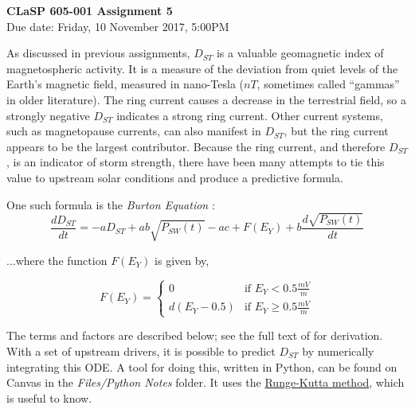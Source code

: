 \documentclass[12pt, letterpaper]{article}
\begin{document}
\begin{center}
  {\LARGE \textbf{CLaSP 605-001 Assignment 5}}\\
  {\large Due date: Friday, 10 November 2017, 5:00PM}\\
\end{center}

As discussed in previous assignments, $D_{ST}$ is a valuable geomagnetic index
of magnetospheric activity.  It is a measure of the deviation from quiet levels
of the Earth's magnetic field, measured in nano-Tesla ($nT$, sometimes called
``gammas'' in older literature).  The ring current causes a decrease in the
terrestrial field, so a strongly negative $D_{ST}$ indicates a strong ring
current.  Other current systems, such as magnetopause currents, can also
manifest in $D_{ST}$, but the ring current appears to be the largest
contributor.  Because the ring current, and therefore $D_{ST}$, is an indicator
of storm strength, there have been many attempts to tie this value to 
upstream solar conditions and produce a predictive formula.

One such formula is the \textit{Burton Equation} \citep{Burton:1975}:
\begin{equation}
  \frac{d D_{ST}}{dt}=-aD_{ST}+ab\sqrt{P_{SW}(t)}-ac+F(E_{Y})+
  b\frac{d\sqrt{P_{SW}(t)}}{dt}
\end{equation}

\noindent ...where the function $F(E_{Y})$ is given by,

\begin{equation}
  \label{eq:F}
  F(E_{Y}) = 
  \begin{cases}
    0 & \text{if $E_Y<0.5\frac{mV}{m}$}\\
    d(E_Y-0.5) & \text{if $E_Y\geq 0.5\frac{mV}{m}$}
  \end{cases}
\end{equation}

\noindent The terms and factors are described below; see the full
text of \citet{Burton:1975} for derivation. With a set of upstream drivers,
it is possible to predict $D_{ST}$ by numerically integrating this ODE.
A tool for doing this, written in Python, can be found on Canvas in the
\emph{Files/Python Notes} folder.
It uses the \href{http://lpsa.swarthmore.edu/NumInt/NumIntFourth.html}
{Runge-Kutta method}, which is useful to know.
\end{document}
